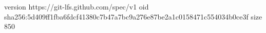 version https://git-lfs.github.com/spec/v1
oid sha256:5d409ff1fba6fdcf41380c7b47a7bc9a276e87be2a1c0158471c554034b0ce3f
size 850
